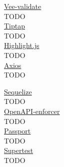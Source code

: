 
\noindent\underline{Vee-validate}\\

TODO \\

\noindent\underline{Tiptap}\\

TODO \\

\noindent\underline{Highlight.js}\\

TODO \\

\noindent\underline{Axios}\\

TODO \\


\noindent\underline{Sequelize}\\

TODO \\

\noindent\underline{OpenAPI-enforcer}\\

TODO \\


\noindent\underline{Passport}\\

TODO \\

\noindent\underline{Supertest}\\

TODO \\